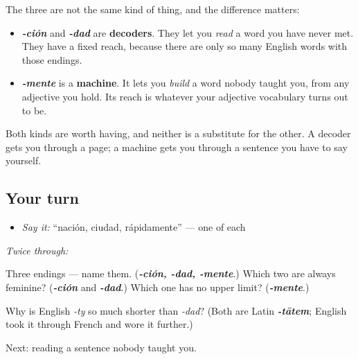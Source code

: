 \begin{grammarlens}[title={Grammar Lens: two kinds of ending}]
The three are not the same kind of thing, and the difference matters:

\begin{itemize}
\raggedright
  \item \emph{\textbf{-ción}} and \emph{\textbf{-dad}} are \textbf{decoders}. They let you \emph{read} a word you have never met. They have a fixed reach, because there are only so many English words with those endings.
  \item \emph{\textbf{-mente}} is a \textbf{machine}. It lets you \emph{build} a word nobody taught you, from any adjective you hold. Its reach is whatever your adjective vocabulary turns out to be.
\end{itemize}

Both kinds are worth having, and neither is a substitute for the other. A decoder gets you through a page; a machine gets you through a sentence you have to say yourself.
\end{grammarlens}

\subsection*{Your turn}
\begin{itemize}
\raggedright
  \item \emph{Say it:} \textquotedblleft{}nación, ciudad, rápidamente\textquotedblright{} — one of each
\end{itemize}

\emph{Twice through:}

\begin{tcolorbox}[breakable,colback=teal!4,colframe=teal!35!black,title={Before you move on}]
Three endings — name them. (\emph{\textbf{-ción, -dad, -mente}}.) Which two are always feminine? (\emph{\textbf{-ción}} and \emph{\textbf{-dad}}.) Which one has no upper limit? (\emph{\textbf{-mente}}.)

Why is English \emph{-ty} so much shorter than \emph{-dad}? (Both are Latin \emph{\textbf{-tātem}}; English took it through French and wore it further.)

Next: reading a sentence nobody taught you.
\end{tcolorbox}
